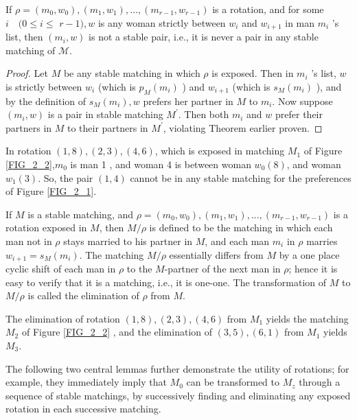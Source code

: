 \begin{lemma}\label{lem_3_1}
If $\rho=\left(m_0, w_0\right),\left(m_1, w_1\right), \ldots,\left(m_{r-1}, w_{r-1}\right)$ is a rotation, and for some $i \quad(0 \leq i \leq$ $r-1), w$ is any woman strictly between $w_i$ and $w_{i+1}$ in man $m_i$ 's list, then $\left(m_i, w\right)$ is not a stable pair, i.e., it is never a pair in any stable matching of $\mathcal{M}$.
\end{lemma}


\begin{proof}
Let $M$ be any stable matching in which $\rho$ is exposed. Then in $m_i$ 's list, $w$ is strictly between $w_i$ (which is $p_M\left(m_i\right)$ ) and $w_{i+1}$ (which is $s_M\left(m_i\right)$ ), and by the definition of $s_M\left(m_i\right), w$ prefers her partner in $M$ to $m_i$. Now suppose $\left(m_i, w\right)$ is a pair in stable matching $M^{\prime}$. Then both $m_i$ and $w$ prefer their partners in $M$ to their partners in $M^{\prime}$, violating Theorem earlier proven.
\end{proof}

\begin{exmp}\label{exmp_3_3}
    In rotation $(1,8),(2,3),(4,6)$, which is exposed in matching $M_1$ of Figure \ref{FIG_2_2},$m_0$ is man 1 , and woman 4 is between woman $w_0(8)$, and woman $w_1(3)$. So, the pair $(1,4)$ cannot be in any stable matching for the preferences of Figure \ref{FIG_2_1}.
\end{exmp}

If $M$ is a stable matching, and $\rho=\left(m_0, w_0\right),\left(m_1, w_1\right), \ldots,\left(m_{r-1}, w_{r-1}\right)$ is a rotation exposed in $M$, then $M / \rho$ is defined to be the matching in which each man not in $\rho$ stays married to his partner in $M$, and each man $m_i$ in $\rho$ marries $w_{i+1}=s_M\left(m_i\right)$. The matching $M / \rho$ essentially differs from $M$ by a one place cyclic shift of each man in $\rho$ to the $M$-partner of the next man in $\rho$; hence it is easy to verify that it is a matching, i.e., it is one-one. The transformation of $M$ to $M / \rho$ is called the elimination of $\rho$ from $M$.

\begin{exmp}\label{exmp_3_4}
    The elimination of rotation $(1,8),(2,3),(4,6)$ from $M_1$ yields the matching $M_2$ of Figure \ref{FIG_2_2} , and the elimination of $(3,5),(6,1)$ from $M_1$ yields $M_3$.
\end{exmp}

The following two central lemmas further demonstrate the utility of rotations; for example, they immediately imply that $M_0$ can be transformed to $M_z$ through a sequence of stable matchings, by successively finding and eliminating any exposed rotation in each successive matching.

